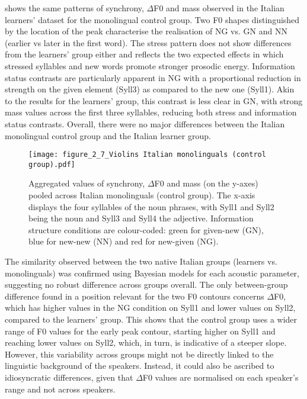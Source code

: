  shows the same patterns of synchrony, ${\Delta}$F0 and mass observed in the Italian learners’ dataset for the monolingual control group. Two F0 shapes distinguished by the location of the peak characterise the realisation of NG vs. GN and NN (earlier vs later in the first word). The stress pattern does not show differences from the learners’ group either and reflects the two expected effects in which stressed syllables and new words promote stronger prosodic energy. Information status contrasts are particularly apparent in NG with a proportional reduction in strength on the given element (Syll3) as compared to the new one (Syll1). Akin to the results for the learners’ group, this contrast is less clear in GN, with strong mass values across the first three syllables, reducing both stress and information status contrasts. Overall, there were no major differences between the Italian monolingual control group and the Italian learner group.

\begin{figure}
\texttt{[image: figure\_2\_7\_Violins Italian monolinguals (control group).pdf]}
\caption{Aggregated values of synchrony, ${\Delta}$F0 and mass (on the y-axes) pooled across Italian monolinguals (control group). The x-axis displays the four syllables of the noun phrases, with Syll1 and Syll2 being the noun and Syll3 and Syll4 the adjective. Information structure conditions are colour-coded: green for given-new (GN), blue for new-new (NN) and red for new-given (NG).}
\label{fig:2.7}
\end{figure}

The similarity observed between the two native Italian groups (learners vs. monolinguals) was confirmed using Bayesian models for each acoustic parameter, suggesting no robust difference across groups overall. The only between-group difference found in a position relevant for the two F0 contours concerns ${\Delta}$F0, which has higher values in the NG condition on Syll1 and lower values on Syll2, compared to the learners’ group. This shows that the control group uses a wider range of F0 values for the early peak contour, starting higher on Syll1 and reaching lower values on Syll2, which, in turn, is indicative of a steeper slope. However, this variability across groups might not be directly linked to the linguistic background of the speakers. Instead, it could also be ascribed to idiosyncratic differences, given that ${\Delta}$F0 values are normalised on each speaker’s range and not across speakers.

